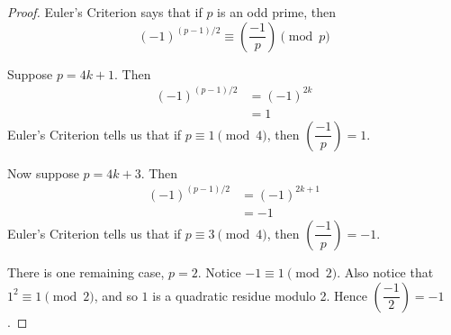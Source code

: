 \begin{proof}
Euler's Criterion says that if $p$ is an odd prime, then
\[ (-1)^{(p-1)/2} \equiv \left( \dfrac{-1}{p} \right) \pmod{p} \]

Suppose $p = 4k + 1$. Then
\begin{align*}
	(-1)^{(p-1)/2} &= (-1)^{2k} \\
				   &= 1
\end{align*}
Euler's Criterion tells us that if $p \equiv 1 \pmod{4}$, then 
$\left( \dfrac{-1}{p} \right) = 1$.

Now suppose $p = 4k + 3$. Then
\begin{align*}
	(-1)^{(p-1)/2} &= (-1)^{2k+1} \\
				   &= -1
\end{align*}
Euler's Criterion tells us that if $p \equiv 3 \pmod{4}$, then
$\left( \dfrac{-1}{p} \right) = -1$.

There is one remaining case, $p=2$. Notice $-1 \equiv 1 \pmod 2$. Also notice
that $1^2 \equiv 1 \pmod 2$, and so $1$ is a quadratic residue modulo 2. Hence
$\left( \dfrac{-1}{2} \right) = -1$.
\end{proof}


